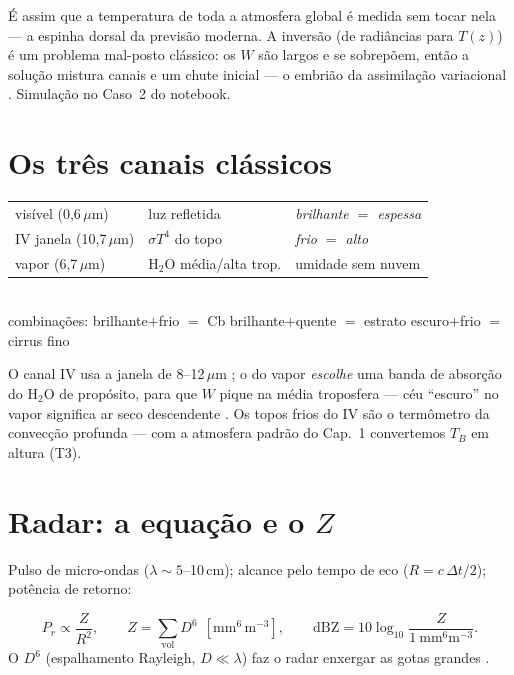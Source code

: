 \documentclass[11pt]{article}
\begin{document}
É assim que a temperatura de toda a atmosfera global é medida sem tocar
nela — a espinha dorsal da previsão moderna. A inversão (de radiâncias
para $T(z)$) é um problema mal-posto clássico: os $W$ são largos e se
sobrepõem, então a solução mistura canais e um chute inicial — o embrião
da assimilação variacional .
Simulação no Caso~2 do notebook.

\section{Os três canais clássicos}\label{sec:canais}

\begin{noquadro}
\begin{tabular}{lll}
visível (0{,}6\,$\mu$m) & luz refletida & \emph{brilhante $=$ espessa}\\
IV janela (10{,}7\,$\mu$m) & $\sigma T^4$ do topo & \emph{frio $=$
alto}\\
vapor (6{,}7\,$\mu$m) & H$_2$O média/alta trop. & umidade sem nuvem\\
\end{tabular}\\[4pt]
combinações: brilhante$+$frio $=$ Cb \quad brilhante$+$quente $=$
estrato \quad escuro$+$frio $=$ cirrus fino
\end{noquadro}


O canal IV usa a janela de 8--12\,$\mu$m ; o do vapor \emph{escolhe} uma banda de absorção do H$_2$O
de propósito, para que $W$ pique na média troposfera — céu ``escuro'' no
vapor significa ar seco descendente . Os topos frios do IV são o termômetro da convecção profunda
 — com a atmosfera padrão do Cap.~1
convertemos $T_B$ em altura (T3).

\section{Radar: a equação e o $Z$}\label{sec:radar}

Pulso de micro-ondas ($\lambda \sim 5$--10\,cm); alcance pelo tempo de
eco ($R = c\,\Delta t/2$); potência de retorno:

\begin{formalivro}
\[ P_r \propto \frac{Z}{R^2},\qquad
Z = \sum_{\text{vol}} D^6\ \ [\mathrm{mm^6\,m^{-3}}],\qquad
\mathrm{dBZ} = 10\log_{10}\!\frac{Z}{1\ \mathrm{mm^6 m^{-3}}}. \]
O $D^6$ (espalhamento Rayleigh, $D \ll \lambda$) faz o radar enxergar
as gotas grandes .
\end{formalivro}
\end{document}
